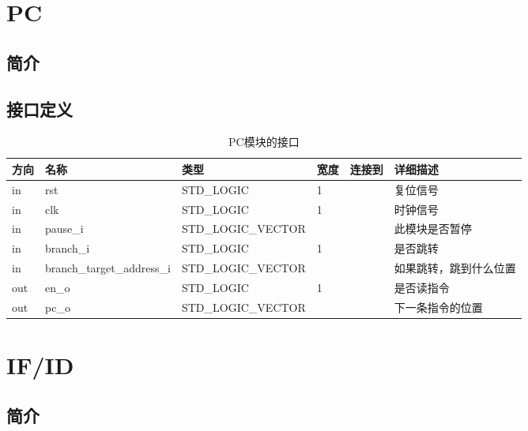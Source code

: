 \documentclass{article}
\begin{document}
\tableofcontents
\newpage

\section{PC}
\label{sec:PC}

\subsection{简介}

\FloatBarrier
\subsection{接口定义}

\begin{table}
    \centering
    \small
    \begin{tabular}{lllllp{1.5cm}}
    \toprule
    方向 & 名称 & 类型 & 宽度 & 连接到 & 详细描述 \\ \midrule
    in & rst\label{PC:rst} & STD_LOGIC & 1 & \nameref{sec:MIPS_CPU} & 复位信号 \\
    in & clk\label{PC:clk} & STD_LOGIC & 1 & \nameref{sec:MIPS_CPU} & 时钟信号 \\
    in & pause_i\label{PC:pause_i} & STD_LOGIC_VECTOR & \nameref{const:CTRL_PAUSE_LEN} & \nameref{sec:PAUSE_CTRL} & 此模块是否暂停 \\
    in & branch_i\label{PC:branch_i} & STD_LOGIC & 1 & \nameref{sec:ID} & 是否跳转 \\
    in & branch_target_address_i\label{PC:branch_target_address_i} & STD_LOGIC_VECTOR  & \nameref{const:INST_ADDR_LEN}  & \nameref{sec:ID} & 如果跳转，跳到什么位置    \\
    out & en_o\label{PC:en_o} & STD_LOGIC & 1 & \nameref{sec:MIPS_CPU} & 是否读指令 \\
    out & pc_o\label{PC:pc_o} & STD_LOGIC_VECTOR & \nameref{const:INST_ADDR_LEN}  & \nameref{sec:MIPS_CPU} & 下一条指令的位置 \\
    \bottomrule
    \end{tabular}
    \caption {PC模块的接口}
\end{table}
\FloatBarrier

\section{IF/ID}
\label{sec:IF/ID}

\subsection{简介}
\end{document}
